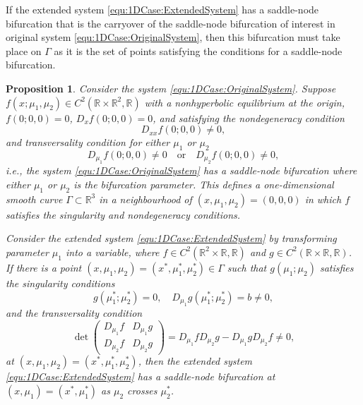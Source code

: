 \documentclass[12pt]{article}
\newtheorem{proposition}{Proposition}
\begin{document}
If the extended system \eqref{equ:1DCase:ExtendedSystem} has a saddle-node bifurcation that is the carryover of the saddle-node bifurcation of interest in original system \eqref{equ:1DCase:OriginalSystem}, then this bifurcation must take place on $\Gamma$ as it is the set of points satisfying the conditions for a saddle-node bifurcation.

\begin{proposition}
    \label{the:1DCase:SaddleNodeBifurcationExtension1D}
    Consider the system \eqref{equ:1DCase:OriginalSystem}. Suppose $f(x;\mu_{1},\mu_{2})\in C^{2}(\mathbb{R}\times \mathbb{R}^{2},\mathbb{R})$ with a nonhyperbolic equilibrium at the origin, $f(0;0,0)=0$, $D_{x}f(0;0,0)=0$, and satisfying the nondegeneracy condition
    \begin{equation*}
        D_{xx}f(0;0,0)\neq 0,
    \end{equation*}
    and transversality condition for either $\mu_{1}$ or $\mu_{2}$
    \begin{equation*}
        D_{\mu_{1}}f(0;0,0)\neq 0 \quad \mathrm{or}\quad D_{\mu_{2}}f(0;0,0)\neq 0,
    \end{equation*}
    i.e., the system \eqref{equ:1DCase:OriginalSystem} has a saddle-node bifurcation where either $\mu_{1}$ or $\mu_{2}$ is the bifurcation parameter. This defines a one-dimensional smooth curve $\Gamma\subset \mathbb{R}^{3}$ in a neighbourhood of $(x,\mu_{1},\mu_{2})=(0,0,0)$ in which $f$ satisfies the singularity and nondegeneracy conditions.

    Consider the extended system \eqref{equ:1DCase:ExtendedSystem} by transforming parameter $\mu_{1}$ into a variable, where $f\in C^{2}(\mathbb{R}^{2}\times \mathbb{R},\mathbb{R})$ and $g\in C^{2}(\mathbb{R}\times\mathbb{R}, \mathbb{R})$. If there is a point $(x,\mu_{1},\mu_{2})=(x^{*},\mu_{1}^{*},\mu_{2}^{*})\in \Gamma$ such that $g(\mu_{1};\mu_{2})$ satisfies the singularity conditions
    \begin{equation}
        g(\mu_{1}^{*}; \mu_{2}^{*})=0, \quad D_{\mu_{1}}g(\mu_{1}^{*};\mu_{2}^{*})=b\neq 0,
        \label{equ:1DCase:Proposition1:SingularityConditions}
    \end{equation}
    and the transversality condition
    \begin{equation}
        \det\begin{pmatrix}
            D_{\mu_{1}}f & D_{\mu_{1}}g \\
            D_{\mu_{2}}f & D_{\mu_{2}}g
        \end{pmatrix} = D_{\mu_{1}}fD_{\mu_{2}}g - D_{\mu_{1}}gD_{\mu_{2}}f \neq 0,
      \label{equ:1DCase:Proposition1:TransversalityCondition}
    \end{equation}
    at $(x,\mu_{1},\mu_{2})=(x^{*},\mu_{1}^{*},\mu_{2}^{*})$, then the extended system  \eqref{equ:1DCase:ExtendedSystem} has a saddle-node bifurcation at $(x,\mu_{1})=(x^{*},\mu_{1}^{*})$ as $\mu_{2}$ crosses $\mu_{2}^{*}$.


\end{proposition}
\end{document}

